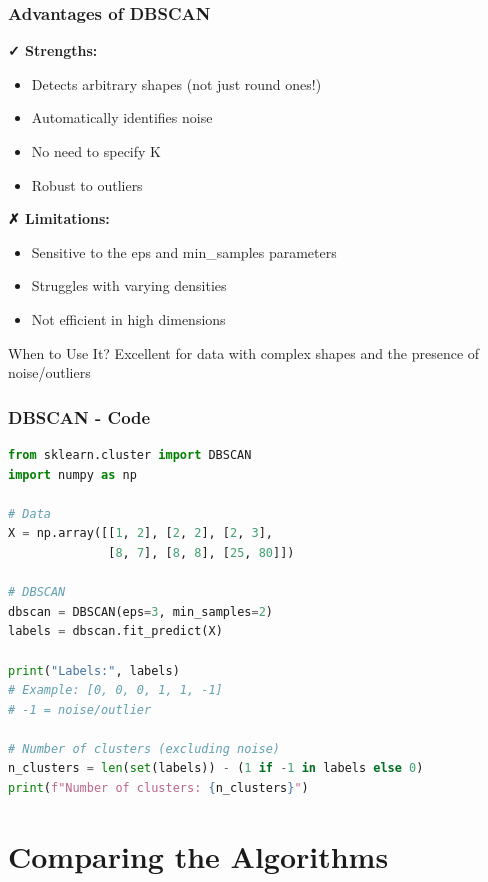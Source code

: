 \documentclass{beamer}
\begin{document}
\begin{frame}
\frametitle{Advantages of DBSCAN}
\textbf{✓ Strengths:}
\begin{itemize}
    \item Detects arbitrary shapes (not just round ones!)
    \item Automatically identifies noise
    \item No need to specify K
    \item Robust to outliers
\end{itemize}

\vspace{1em}
\textbf{✗ Limitations:}
\begin{itemize}
    \item Sensitive to the eps and min\_samples parameters
    \item Struggles with varying densities
    \item Not efficient in high dimensions
\end{itemize}

\vspace{1em}
\begin{block}{When to Use It?}
Excellent for data with complex shapes and the presence of noise/outliers
\end{block}
\end{frame}

\begin{frame}[fragile]
\frametitle{DBSCAN - Code}
\begin{lstlisting}[language=Python]
from sklearn.cluster import DBSCAN
import numpy as np

# Data
X = np.array([[1, 2], [2, 2], [2, 3],
              [8, 7], [8, 8], [25, 80]])

# DBSCAN
dbscan = DBSCAN(eps=3, min_samples=2)
labels = dbscan.fit_predict(X)

print("Labels:", labels)
# Example: [0, 0, 0, 1, 1, -1]
# -1 = noise/outlier

# Number of clusters (excluding noise)
n_clusters = len(set(labels)) - (1 if -1 in labels else 0)
print(f"Number of clusters: {n_clusters}")
\end{lstlisting}
\end{frame}

\section{Comparing the Algorithms}
\end{document}
